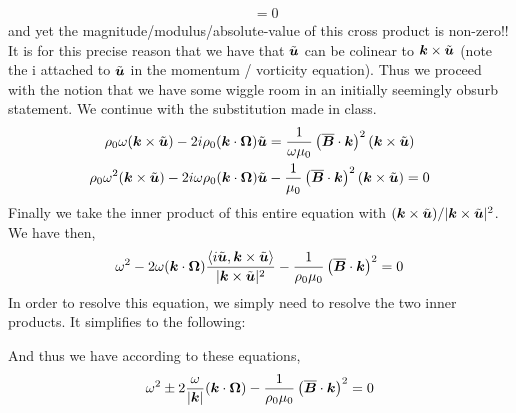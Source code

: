 \documentclass{article}
\begin{document}
\begin{enumerate}[label=\alph*.)]
\begin{align*}
        &= 0
    \end{align*}
    and yet the magnitude/modulus/absolute-value of this cross product is
    non-zero!! It is for this precise reason that we have that $\tilde{\boldsymbol{u}}$
    can be colinear to $\boldsymbol{k}\times\tilde{\boldsymbol{u}}$ (note the i attached to
    $\tilde{\boldsymbol{u}}$ in the momentum / vorticity equation). Thus we proceed with
    the notion that we have some wiggle room in an initially seemingly obsurb
    statement. We continue with the substitution made in class. 
    \begin{gather*}
        \rho_0\omega(\boldsymbol{k}\times\tilde{\boldsymbol{u}}) -
        2i\rho_0(\boldsymbol{k}\cdot\boldsymbol{\Omega})\tilde{\boldsymbol{u}} =
        \frac{1}{\omega\mu_0}\left(\overline{\boldsymbol{B}}\cdot\boldsymbol{k}\right)^2(\boldsymbol{k}\times\tilde{\boldsymbol{u}})\\
        \rho_0\omega^2(\boldsymbol{k}\times\tilde{\boldsymbol{u}}) -
        2i\omega\rho_0(\boldsymbol{k}\cdot\boldsymbol{\Omega})\tilde{\boldsymbol{u}} -
        \frac{1}{\mu_0}\left(\overline{\boldsymbol{B}}\cdot\boldsymbol{k}\right)^2(\boldsymbol{k}\times\tilde{\boldsymbol{u}})
        = 0
    \end{gather*}
    Finally we take the inner product of this entire equation with
    $(\boldsymbol{k}\times\tilde{\boldsymbol{u}})/|\boldsymbol{k}\times\tilde{\boldsymbol{u}}|^2$. We have then, 
    \begin{gather*}
        \omega^2 -
        2\omega(\boldsymbol{k}\cdot\boldsymbol{\Omega})\frac{\left<i\tilde{\boldsymbol{u}},
        \boldsymbol{k}\times\tilde{\boldsymbol{u}}\right>}{|\boldsymbol{k}\times\tilde{\boldsymbol{u}}|^2} -
        \frac{1}{\rho_0\mu_0}\left(\overline{\boldsymbol{B}}\cdot\boldsymbol{k}\right)^2
        = 0
    \end{gather*}
    In order to resolve this equation, we simply need to resolve the two inner
    products. It simplifies to the following:

    And thus we have according to these equations, 
    \begin{gather*}
        \omega^2 \pm 2\frac{\omega}{|\boldsymbol{k}|}(\boldsymbol{k}\cdot\boldsymbol{\Omega}) 
        - \frac{1}{\rho_0\mu_0}\left(\overline{\boldsymbol{B}}\cdot\boldsymbol{k}\right)^2
        = 0
    \end{gather*}


\end{enumerate}
\end{document}
